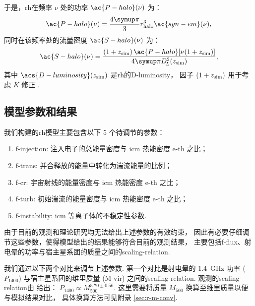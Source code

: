 于是，\ac{rh}在频率 $\nu$ 处的功率 $\ac{P-halo}(\nu)$ 为：
\begin{equation}
  \label{eq:halo-power}
  \ac{P-halo}(\nu) = \frac{4\Cpi}{3} r_{\R{halo}}^3 \ac{syn-em}(\nu) ,
\end{equation}
同时在该频率处的流量密度 $\ac{S-halo}(\nu)$ 为：
\begin{equation}
  \label{eq:halo-flux}
  \ac{S-halo}(\nu) =
    \frac{(1+z_{\R{sim}}) \,\ac{P-halo}[\nu(1+z_{\R{sim}})]}{
      4\Cpi D_{\!L}^2(z_{\R{sim}})} ,
\end{equation}
其中
$\acs{D-luminosity}(z_{\R{sim}})$ 是\ac{rh}的\acl{D-luminosity}，
因子 $(1 + z_{\mathrm{sim}})$ 用于考虑 $K$ 修正 \cite{hogg1999}.

\subsection{模型参数和结果}
\label{sec:halo-results}

我们构建的\ac{rh}模型主要包含以下 5 个待调节的参数：
\begin{enumerate}
  \item \ac{f-injection}:
    注入电子的总能量密度与 \ac{icm} 热能密度 \ac{e-th} 之比；
  \item \ac{f-trans}:
    并合释放的能量中转化为湍流能量的比例；
  \item \ac{f-cr}:
    宇宙射线的能量密度与 \ac{icm} 热能密度 \ac{e-th} 之比；
  \item \ac{f-turb}:
    初始湍流的能量密度与 \ac{icm} 热能密度 \ac{e-th} 之比；
  \item \ac{f-instability}:
    \ac{icm} 等离子体的不稳定性参数.
\end{enumerate}
由于目前的观测和理论研究均无法给出上述参数的有效约束，
因此有必要仔细调节这些参数，使得模型给出的结果能够符合目前的观测结果，
主要包括\ac{f-flux}、射电晕的功率与宿主星系团的质量之间的\ac{scaling-relation}.

我们通过以下两个对比来调节上述参数.
第一个对比是射电晕的 \SI{1.4}{\GHz} 功率 ($P_{1400}$)
与宿主星系团的维里质量 (\ac{M-vir}) 之间的\ac{scaling-relation}.
观测的\ac{scaling-relation}由  给出：
$P_{1400} \propto M_{500}^{3.70 \pm 0.56}$.
这里需要将质量 $M_{500}$ 换算至维里质量以便与模拟结果对比，
具体换算方法可见附录 \autoref{sec:r-m-conv}.

